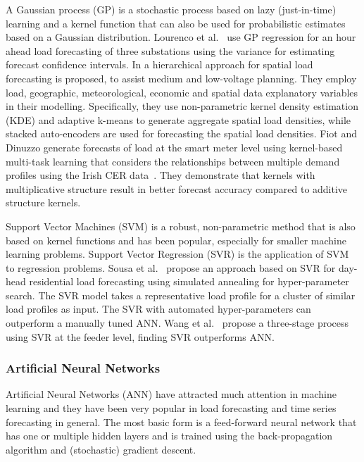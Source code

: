 A Gaussian process (GP) is a stochastic process based on lazy (just-in-time) learning and a kernel function that can also be used for probabilistic estimates based on a Gaussian distribution. Lourenco et al.~\cite{lourenco2012stl} use GP regression for an hour ahead load forecasting of three substations using the variance for estimating forecast confidence intervals. In \cite{Ye2019adb} a hierarchical approach for spatial load forecasting is proposed, to assist medium and low-voltage planning. They employ load, geographic, meteorological, economic and spatial data explanatory variables in their modelling. Specifically, they use non-parametric kernel density estimation (KDE) and adaptive k-means to generate aggregate spatial load densities, while stacked auto-encoders are used for forecasting the spatial load densities. Fiot and Dinuzzo \cite{fiot2018edf} generate forecasts of load at the smart meter level using kernel-based multi-task learning that considers the relationships between multiple demand profiles using the Irish CER data~\cite{Commission2012csm}. They demonstrate that kernels with multiplicative structure result in better forecast accuracy compared to additive structure kernels.


Support Vector Machines (SVM) is a robust, non-parametric method that is also based on kernel functions and has been popular, especially for smaller machine learning problems. Support Vector Regression (SVR) is the application of SVM to regression problems. Sousa et al.~\cite{sousa2014slf} propose an approach based on SVR for day-head residential load forecasting using simulated annealing for hyper-parameter search. The SVR model takes a representative load profile for a cluster of similar load profiles as input. The SVR with automated hyper-parameters can outperform a manually tuned ANN. Wang et al.~\cite{wang2013acv} propose a three-stage process using SVR at the feeder level, finding SVR outperforms ANN.

\subsubsection{Artificial Neural Networks}

Artificial Neural Networks (ANN) have attracted much attention in machine learning and they have been very popular in load forecasting and time series forecasting in general. The most basic form is a feed-forward neural network that has one or multiple hidden layers and is trained using the back-propagation algorithm and (stochastic) gradient descent. 

